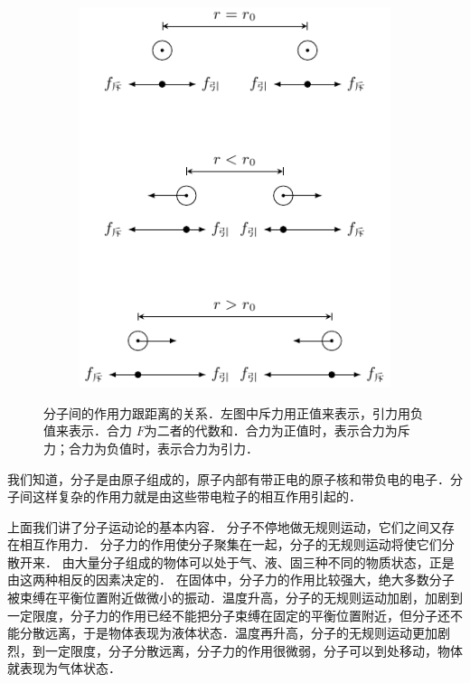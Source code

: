 \begin{figure}[htbp]
\begin{subfigure}{0.4\linewidth}
        \includegraphics{fig/B/1-7b.pdf}
        \caption{}\label{fig_B_1-7b}
    \end{subfigure}
    \caption{分子间的作用力跟距离的关系．左图中斥力用正值来表示，引力用负值来表示．合力
    $F$为二者的代数和．合力为正值时，表示合力为斥力；合力为负值时，表示合力为引力．
    }\label{fig_B_1-7}
\end{figure}

我们知道，分子是由原子组成的，原子内部有带正电的原子核和带负电的电子．分子间这样复杂的作用力就是由这些带电粒子的相互作用引起的．

上面我们讲了分子运动论的基本内容．
分子不停地做无规则运动，它们之间又存在相互作用力．
分子力的作用使分子聚集在一起，分子的无规则运动将使它们分散开来．
由大量分子组成的物体可以处于气、液、固三种不同的物质状态，正是由这两种相反的因素决定的．
在固体中，分子力的作用比较强大，绝大多数分子被束缚在平衡位置附近做微小的振动．温度升高，分子的无规则运动加剧，加剧到一定限度，分子力的作用已经不能把分子束缚在固定的平衡位置附近，但分子还不能分散远离，于是物体表现为液体状态．温度再升高，分子的无规则运动更加剧烈，到一定限度，分子分散远离，分子力的作用很微弱，分子可以到处移动，物体就表现为气体状态．

